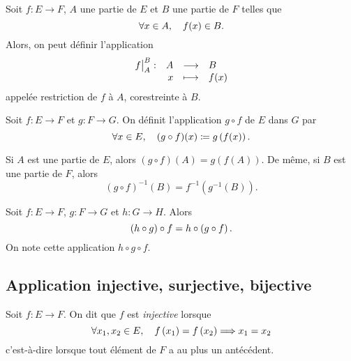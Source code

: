 \documentclass{magnolia}
\begin{document}
\begin{remarqueUnique}
\remarque Soit $f:E\to F$, $A$ une partie de $E$ et $B$ une partie de $F$
  telles que
  \[\forall x\in A,\quad f(x)\in B.\]
  Alors, on peut définir l'application
  \[\dspappli{\restricorestri{f}{A}{B}}{A}{B}{x}{f(x)}\]
  appelée restriction de $f$ à $A$, corestreinte à $B$.
\end{remarqueUnique}



\begin{definition}[utile=-3]
Soit $f:E\to F$ et $g:F\to G$. On définit l'application $g\circ f$ de $E$ dans $G$ par
\[\forall x\in E,\quad (g\circ f)(x)\coloneqq g\left(f(x)\right).\]
\end{definition}

\begin{remarqueUnique}
\remarque Si $A$ est une partie de $E$, alors $(g\circ f)(A)=g(f(A))$. De même, si
  $B$ est une partie de $F$, alors \[(g\circ f)^{-1}(B)=f^{-1}(g^{-1}(B)).\]
\end{remarqueUnique}


\begin{proposition}[utile=-3]
Soit $f:E\to F$, $g:F\to G$ et $h:G\to H$. Alors
\[\left(h\circ g\right)\circ f=h\circ\left(g\circ f\right).\]
On note cette application $h\circ g\circ f$.
\end{proposition}

\subsection{Application injective, surjective, bijective}

\begin{definition}[utile=-3]
Soit $f:E\to F$. On dit que $f$ est \emph{injective} lorsque
\[\forall x_1,x_2\in E ,\quad f\left(x_1\right)=f\left(x_2\right) \Longrightarrow x_1=x_2\]
c'est-à-dire lorsque tout élément de $F$ a au plus un antécédent.
\end{definition}
\end{document}
